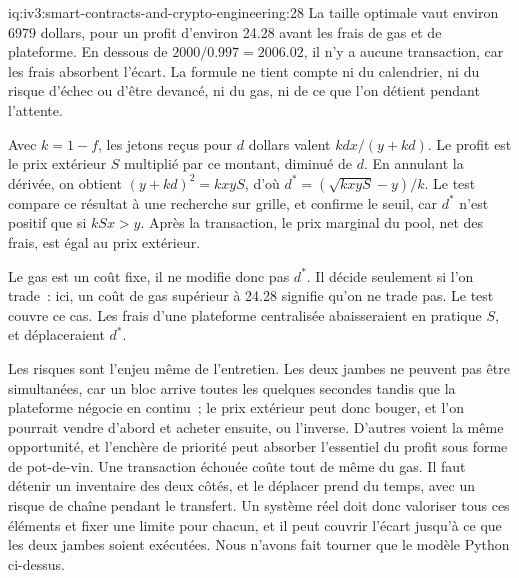 \begin{solution}{iq:iv3:smart-contracts-and-crypto-engineering:28}
La taille optimale vaut environ 6979 dollars, pour un profit d'environ 24.28 avant les frais de gas et de plateforme. En dessous de $2000 / 0.997 = 2006.02$, il n'y a aucune transaction, car les frais absorbent l'écart. La formule ne tient compte ni du calendrier, ni du risque d'échec ou d'être devancé, ni du gas, ni de ce que l'on détient pendant l'attente.
\enlargethispage{-2\baselineskip}%
\label{lst:iv3:cr:arb}

Avec $k = 1 - f$, les jetons reçus pour $d$ dollars valent $k d x / (y + k d)$. Le profit est le prix extérieur $S$ multiplié par ce montant, diminué de $d$. En annulant la dérivée, on obtient $(y + k d)^2 = k x y S$, d'où $d^* = (\sqrt{k x y S} - y) / k$. Le test compare ce résultat à une recherche sur grille, et confirme le seuil, car $d^*$ n'est positif que si $k S x > y$. Après la transaction, le prix marginal du pool, net des frais, est égal au prix extérieur.

Le gas est un coût fixe, il ne modifie donc pas $d^*$. Il décide seulement si l'on trade~: ici, un coût de gas supérieur à 24.28 signifie qu'on ne trade pas. Le test couvre ce cas. Les frais d'une plateforme centralisée abaisseraient en pratique $S$, et déplaceraient $d^*$.

Les risques sont l'enjeu même de l'entretien. Les deux jambes ne peuvent pas être simultanées, car un bloc arrive toutes les quelques secondes tandis que la plateforme négocie en continu~; le prix extérieur peut donc bouger, et l'on pourrait vendre d'abord et acheter ensuite, ou l'inverse. D'autres voient la même opportunité, et l'enchère de priorité peut absorber l'essentiel du profit sous forme de pot-de-vin. Une transaction échouée coûte tout de même du gas. Il faut détenir un inventaire des deux côtés, et le déplacer prend du temps, avec un risque de chaîne pendant le transfert. Un système réel doit donc valoriser tous ces éléments et fixer une limite pour chacun, et il peut couvrir l'écart jusqu'à ce que les deux jambes soient exécutées. Nous n'avons fait tourner que le modèle Python ci-dessus.

\end{solution}

